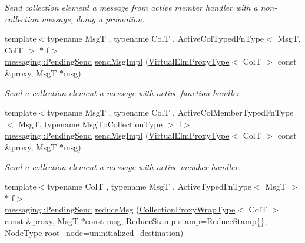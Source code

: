 \begin{DoxyCompactItemize}
\begin{DoxyCompactList}\small\item\em Send collection element a message from active member handler with a non-\/collection message, doing a promotion. \end{DoxyCompactList}\item 
{\footnotesize template$<$typename MsgT , typename ColT , Active\+Col\+Typed\+Fn\+Type$<$ Msg\+T, Col\+T $>$ $\ast$ f$>$ }\\\hyperlink{structvt_1_1messaging_1_1_pending_send}{messaging\+::\+Pending\+Send} \hyperlink{structvt_1_1vrt_1_1collection_1_1_collection_manager_afc14691c6992cc5d7e51118b1386b67c}{send\+Msg\+Impl} (\hyperlink{namespacevt_1_1vrt_a620a5c8c59d13e513f690c74b4af516f}{Virtual\+Elm\+Proxy\+Type}$<$ ColT $>$ const \&proxy, MsgT $\ast$msg)
\begin{DoxyCompactList}\small\item\em Send a collection element a message with active function handler. \end{DoxyCompactList}\item 
{\footnotesize template$<$typename MsgT , typename ColT , Active\+Col\+Member\+Typed\+Fn\+Type$<$ Msg\+T, typename Msg\+T\+::\+Collection\+Type $>$ f$>$ }\\\hyperlink{structvt_1_1messaging_1_1_pending_send}{messaging\+::\+Pending\+Send} \hyperlink{structvt_1_1vrt_1_1collection_1_1_collection_manager_afc14691c6992cc5d7e51118b1386b67c}{send\+Msg\+Impl} (\hyperlink{namespacevt_1_1vrt_a620a5c8c59d13e513f690c74b4af516f}{Virtual\+Elm\+Proxy\+Type}$<$ ColT $>$ const \&proxy, MsgT $\ast$msg)
\begin{DoxyCompactList}\small\item\em Send a collection element a message with active member handler. \end{DoxyCompactList}\item 
{\footnotesize template$<$typename ColT , typename MsgT , Active\+Typed\+Fn\+Type$<$ Msg\+T $>$ $\ast$ f$>$ }\\\hyperlink{structvt_1_1messaging_1_1_pending_send}{messaging\+::\+Pending\+Send} \hyperlink{structvt_1_1vrt_1_1collection_1_1_collection_manager_a2ac056928e39edf125420e1113cde2bf}{reduce\+Msg} (\hyperlink{structvt_1_1vrt_1_1collection_1_1_collection_manager_a56458ed7f9bb22b631b9b3a745f42f94}{Collection\+Proxy\+Wrap\+Type}$<$ ColT $>$ const \&proxy, MsgT $\ast$const msg, \hyperlink{structvt_1_1vrt_1_1collection_1_1_collection_manager_ae8aac19e0ae07e9225142e5880eac830}{Reduce\+Stamp} stamp=\hyperlink{structvt_1_1vrt_1_1collection_1_1_collection_manager_ae8aac19e0ae07e9225142e5880eac830}{Reduce\+Stamp}\{\}, \hyperlink{namespacevt_a866da9d0efc19c0a1ce79e9e492f47e2}{Node\+Type} root\+\_\+node=uninitialized\+\_\+destination)

\end{DoxyCompactItemize}
